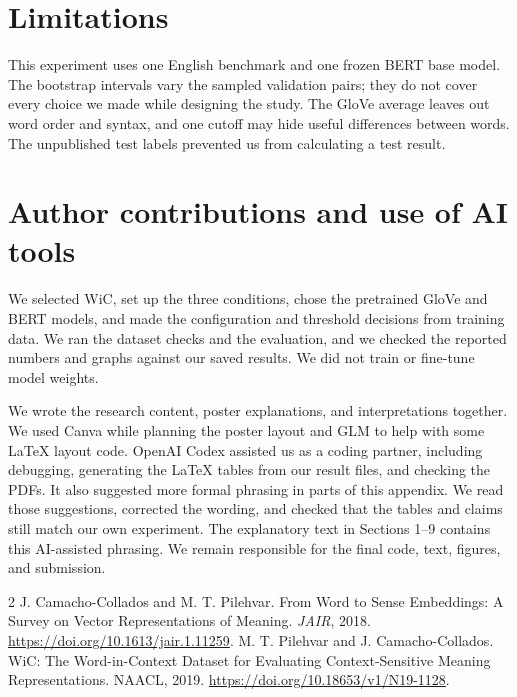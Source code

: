 \documentclass[11pt]{article}
\begin{document}
\section{Limitations}
This experiment uses one English benchmark and one frozen BERT base model. The
bootstrap intervals vary the sampled validation pairs; they do not cover every
choice we made while designing the study. The GloVe average leaves out word
order and syntax, and one cutoff may hide useful differences between words.
The unpublished test labels prevented us from calculating a test result.

\section{Author contributions and use of AI tools}
We selected WiC, set up the three conditions, chose the pretrained GloVe and
BERT models, and made the configuration and threshold decisions from training
data. We ran the dataset checks and the evaluation, and we checked the reported
numbers and graphs against our saved results. We did not train or fine-tune
model weights.

We wrote the research content, poster explanations, and interpretations
together. We used Canva while planning the poster layout and GLM to help with
some LaTeX layout code. OpenAI Codex assisted us as a coding partner, including
debugging, generating the LaTeX tables from our result files, and checking the
PDFs. It also suggested more formal phrasing in parts of this appendix. We read
those suggestions, corrected the wording, and checked that the tables and
claims still match our own experiment. The explanatory text in Sections 1--9
contains this AI-assisted phrasing. We remain responsible for the final code,
text, figures, and submission.

\clearpage
{}
\begin{thebibliography}{2}
 J. Camacho-Collados and M. T. Pilehvar. From Word to Sense
Embeddings: A Survey on Vector Representations of Meaning. \emph{JAIR}, 2018.
\url{https://doi.org/10.1613/jair.1.11259}.
 M. T. Pilehvar and J. Camacho-Collados. WiC: The Word-in-Context
Dataset for Evaluating Context-Sensitive Meaning Representations. NAACL, 2019.
\url{https://doi.org/10.18653/v1/N19-1128}.
\end{thebibliography}

\clearpage


\end{document}
